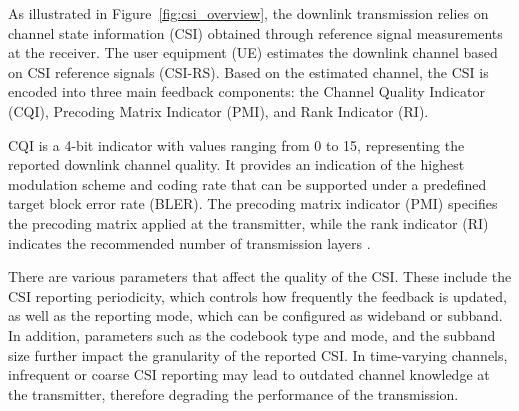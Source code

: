 \documentclass[a4paper,12pt,onecolumn]{article}
\begin{document}
	\begin{highlightblock}
		As illustrated in Figure~\ref{fig:csi_overview}, the downlink transmission relies on channel state information (CSI) obtained through reference signal measurements at the receiver. The user equipment (UE) estimates the downlink channel based on CSI reference signals (CSI-RS). Based on the estimated channel, the CSI is encoded into three main feedback components: the Channel Quality Indicator (CQI), Precoding Matrix Indicator (PMI), and Rank Indicator (RI).
		
		CQI is a 4-bit indicator with values ranging from 0 to 15, representing the reported downlink channel quality. It provides an indication of the highest modulation scheme and coding rate that can be supported under a predefined target block error rate (BLER). The precoding matrix indicator (PMI) specifies the precoding matrix applied at the transmitter, while the rank indicator (RI) indicates the recommended number of transmission layers \cite{Matlab_PDSCH_CSI}.
		
		There are various parameters that affect the quality of the CSI. These include the CSI reporting periodicity, which controls how frequently the feedback is updated, as well as the reporting mode, which can be configured as wideband or subband. In addition, parameters such as the codebook type and mode, and the subband size further impact the granularity of the reported CSI. In time-varying channels, infrequent or coarse CSI reporting may lead to outdated channel knowledge at the transmitter, therefore degrading the performance of the transmission.
	\end{highlightblock}
\end{document}
